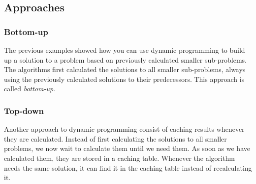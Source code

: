 \subsection{Approaches}
\subsubsection{Bottom-up}
The previous examples showed how you can use dynamic programming to build up a solution to a problem based on previously calculated smaller sub-problems.
The algorithms first calculated the solutions to all smaller sub-problems, always using the previously calculated solutions to their predecessors.
This approach is called \emph{bottom-up}.

\subsubsection{Top-down}
Another approach to dynamic programming consist of caching results whenever they are calculated. 
Instead of first calculating the solutions to all smaller problems, we now wait to calculate them until we need them.
As soon as we have calculated them, they are stored in a caching table. 
Whenever the algorithm needs the same solution, it can find it in the caching table instead of recalculating it.